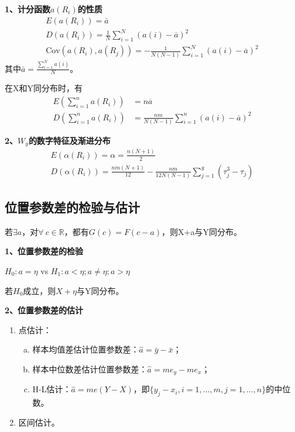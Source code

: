 \documentclass[lang=cn,10pt]{elegantbook}
\begin{document}
\textbf{1、计分函数$a(R_i)$的性质}
\begin{equation}
    \begin{gathered}
    E(a(R_{i}))=\bar{a}  \\
    D(a(R_i))=\frac{1}{N}\sum_{i=1}^{N}(a(i)-\overline{a})^2 \\
    \mathrm{Cov}\left(a(R_{i}),a(R_{j})\right)=-\frac{1}{N(N-1)}\sum_{i=1}^{N}(a(i)-\overline{a})^{2} 
    \end{gathered}
\end{equation}
其中$\bar{a} = \frac{\sum_{i=1}^N a(i)}N$。

\begin{theorem}
    在X和Y同分布时，有
    \begin{equation}
        \begin{aligned}
            E(\sum_{i=1}^na(R_i))&=n\overline{a}\\
            D(\sum_{i=1}^na(R_i))&=\frac{nm}{N(N-1)}\sum_{i=1}^n(a(i)-\overline{a})^2
        \end{aligned}
    \end{equation}
\end{theorem}

\textbf{2、$W_y$的数字特征及渐进分布}
\begin{equation}
    \begin{gathered}
    E(\alpha(R_i))=\alpha=\frac{n(N+1)}{2} \\
    D(\alpha(R_i))=\frac{nm(N+1)}{12}-\frac{nm}{12N(N-1)}\sum_{j=1}^{g}(\tau_j^3-\tau_j)
    \end{gathered}
\end{equation}

\subsection{位置参数差的检验与估计}
若$\exists a$，对$\forall ~ c \in \mathbb{R}$，都有$G(c) = F(c-a)$，则X+a与Y同分布。

\textbf{1、位置参数差的检验}
\begin{center}
    $H_0:a = \eta $ vs $H_1:a < \eta; a \neq \eta; a > \eta$
\end{center}
若$H_0$成立，则$X+\eta$与Y同分布。

\textbf{2、位置参数差的估计}
\begin{enumerate}[(1)]
    \item 点估计：
    \begin{enumerate}[(a)]
        \item 样本均值差估计位置参数差：$\hat{a} = \bar{y}-\bar{x}$；
        \item 样本中位数差估计位置参数差：$\hat{a} = me_{y}-me_{x}$；
        \item H-L估计：$\hat{a} = me(Y-X)$，即$\{y_j - x_i,i = 1,...,m,j = 1,...,n\}$的中位数。
    \end{enumerate}
    \item 区间估计。
\end{enumerate}
\end{document}
